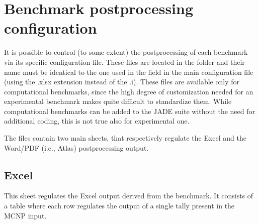 \documentclass[letterpaper,10pt,english]{sphinxmanual}
\let\sphinxpxdimen\pdfpxdimen\else\newdimen\sphinxpxdimen
\begin{document}
\section{Benchmark post\sphinxhyphen{}processing configuration}
\label{\detokenize{usage/configuration:benchmark-post-processing-configuration}}\label{\detokenize{usage/configuration:ppconf}}
\sphinxAtStartPar
It is possible to control (to some extent) the post\sphinxhyphen{}processing of each benchmark via its
specific configuration file. These files are located in the 
folder and their name must be identical to the one used in the  field in the main configuration file
(using the .xlsx extension instead of the .i). These files are available only for computational benchmarks,
since the high degree of customization needed for an experimental benchmark makes quite difficult to
standardize them. While computational benchmarks can be added to the JADE suite without the need for additional
coding, this is not true also for experimental one.

\sphinxAtStartPar
The files contain two main sheets, that respectively regulate the Excel and the Word/PDF (i.e., Atlas) post\sphinxhyphen{}processing output.


\subsection{Excel}
\label{\detokenize{usage/configuration:excel}}
\noindent\sphinxincludegraphics[width=600\sphinxpxdimen]{{excelbench}.png}

\sphinxAtStartPar
This sheet regulates the Excel output derived from the benchmark. It consists of a table where each row regulates
the output of a single tally present in the MCNP input.
\end{document}
